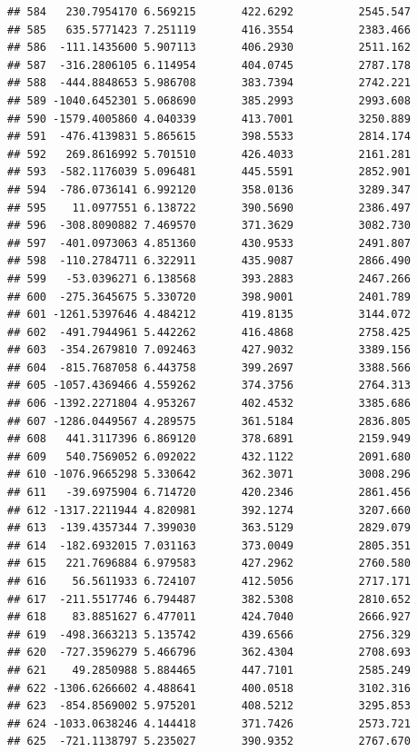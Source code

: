 \documentclass[
]{article}
\begin{document}
\begin{verbatim}
## 584   230.7954170 6.569215       422.6292          2545.547
## 585   635.5771423 7.251119       416.3554          2383.466
## 586  -111.1435600 5.907113       406.2930          2511.162
## 587  -316.2806105 6.114954       404.0745          2787.178
## 588  -444.8848653 5.986708       383.7394          2742.221
## 589 -1040.6452301 5.068690       385.2993          2993.608
## 590 -1579.4005860 4.040339       413.7001          3250.889
## 591  -476.4139831 5.865615       398.5533          2814.174
## 592   269.8616992 5.701510       426.4033          2161.281
## 593  -582.1176039 5.096481       445.5591          2852.901
## 594  -786.0736141 6.992120       358.0136          3289.347
## 595    11.0977551 6.138722       390.5690          2386.497
## 596  -308.8090882 7.469570       371.3629          3082.730
## 597  -401.0973063 4.851360       430.9533          2491.807
## 598  -110.2784711 6.322911       435.9087          2866.490
## 599   -53.0396271 6.138568       393.2883          2467.266
## 600  -275.3645675 5.330720       398.9001          2401.789
## 601 -1261.5397646 4.484212       419.8135          3144.072
## 602  -491.7944961 5.442262       416.4868          2758.425
## 603  -354.2679810 7.092463       427.9032          3389.156
## 604  -815.7687058 6.443758       399.2697          3388.566
## 605 -1057.4369466 4.559262       374.3756          2764.313
## 606 -1392.2271804 4.953267       402.4532          3385.686
## 607 -1286.0449567 4.289575       361.5184          2836.805
## 608   441.3117396 6.869120       378.6891          2159.949
## 609   540.7569052 6.092022       432.1122          2091.680
## 610 -1076.9665298 5.330642       362.3071          3008.296
## 611   -39.6975904 6.714720       420.2346          2861.456
## 612 -1317.2211944 4.820981       392.1274          3207.660
## 613  -139.4357344 7.399030       363.5129          2829.079
## 614  -182.6932015 7.031163       373.0049          2805.351
## 615   221.7696884 6.979583       427.2962          2760.580
## 616    56.5611933 6.724107       412.5056          2717.171
## 617  -211.5517746 6.794487       382.5308          2810.652
## 618    83.8851627 6.477011       424.7040          2666.927
## 619  -498.3663213 5.135742       439.6566          2756.329
## 620  -727.3596279 5.466796       362.4304          2708.693
## 621    49.2850988 5.884465       447.7101          2585.249
## 622 -1306.6266602 4.488641       400.0518          3102.316
## 623  -854.8569002 5.975201       408.5212          3295.853
## 624 -1033.0638246 4.144418       371.7426          2573.721
## 625  -721.1138797 5.235027       390.9352          2767.670

\end{verbatim}
\end{document}

